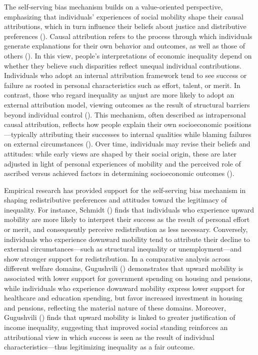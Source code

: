\documentclass[
  13pt,
]{article}
\begin{document}
The self-serving bias mechanism builds on a value-oriented perspective,
emphasizing that individuals' experiences of social mobility shape their
causal attributions, which in turn influence their beliefs about justice
and distributive preferences
(). Causal
attribution refers to the process through which individuals generate
explanations for their own behavior and outcomes, as well as those of
others (). In this view, people's interpretations of economic inequality
depend on whether they believe such disparities reflect unequal
individual contributions. Individuals who adopt an internal attribution
framework tend to see success or failure as rooted in personal
characteristics such as effort, talent, or merit. In contrast, those who
regard inequality as unjust are more likely to adopt an external
attribution model, viewing outcomes as the result of structural barriers
beyond individual control (). This mechanism, often described as intrapersonal
causal attribution, reflects how people explain their own socioeconomic
positions---typically attributing their successes to internal qualities
while blaming failures on external circumstances
(). Over
time, individuals may revise their beliefs and attitudes: while early
views are shaped by their social origin, these are later adjusted in
light of personal experiences of mobility and the perceived role of
ascribed versus achieved factors in determining socioeconomic outcomes
().

Empirical research has provided support for the self-serving bias
mechanism in shaping redistributive preferences and attitudes toward the
legitimacy of inequality. For instance, Schmidt
() finds that individuals
who experience upward mobility are more likely to interpret their
success as the result of personal effort or merit, and consequently
perceive redistribution as less necessary. Conversely, individuals who
experience downward mobility tend to attribute their decline to external
circumstances---such as structural inequality or unemployment---and show
stronger support for redistribution. In a comparative analysis across
different welfare domains, Gugushvili
() demonstrates that
upward mobility is associated with lower support for government spending
on housing and pensions, while individuals who experience downward
mobility express lower support for healthcare and education spending,
but favor increased investment in housing and pensions, reflecting the
material nature of these domains. Moreover, Gugushvili
() finds that
upward mobility is linked to greater justification of income inequality,
suggesting that improved social standing reinforces an attributional
view in which success is seen as the result of individual
characteristics---thus legitimizing inequality as a fair outcome.
\end{document}
